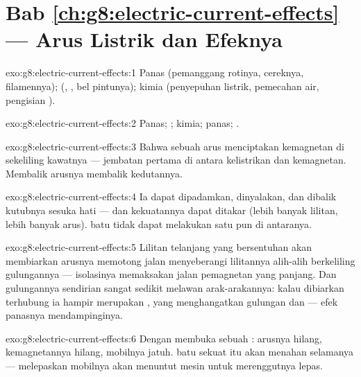 \section*{Bab \ref{ch:g8:electric-current-effects} --- Arus Listrik dan Efeknya}

\begin{solution}{exo:g8:electric-current-effects:1}
Panas (pemanggang rotinya, cereknya, filamennya); 
(, , bel pintunya); kimia (penyepuhan listrik,
pemecahan air, pengisian ).
\end{solution}

\begin{solution}{exo:g8:electric-current-effects:2}
Panas; ; kimia; panas; .
\end{solution}

\begin{solution}{exo:g8:electric-current-effects:3}
Bahwa sebuah arus menciptakan kemagnetan di sekeliling kawatnya ---
jembatan pertama di antara kelistrikan dan kemagnetan. Membalik
arusnya membalik kedutannya.
\end{solution}

\begin{solution}{exo:g8:electric-current-effects:4}
Ia dapat dipadamkan, dinyalakan, dan dibalik kutubnya sesuka hati ---
dan kekuatannya dapat ditakar (lebih banyak lilitan, lebih banyak
arus).  batu tidak dapat melakukan satu pun di antaranya.
\end{solution}

\begin{solution}{exo:g8:electric-current-effects:5}
Lilitan telanjang yang bersentuhan akan membiarkan arusnya memotong
jalan menyeberangi lilitannya alih-alih berkeliling gulungannya ---
isolasinya memaksakan jalan pemagnetan yang panjang. Dan gulungannya
sendirian sangat sedikit melawan arak-arakannya: kalau dibiarkan
terhubung ia hampir merupakan , yang menghangatkan gulungan
dan  --- efek panasnya mendampinginya.
\end{solution}

\begin{solution}{exo:g8:electric-current-effects:6}
Dengan membuka sebuah : arusnya hilang, kemagnetannya hilang,
mobilnya jatuh.  batu sekuat itu akan menahan selamanya ---
melepaskan mobilnya akan menuntut mesin untuk merenggutnya lepas.
\end{solution}

